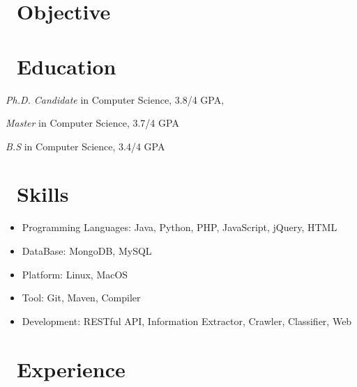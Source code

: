 \documentclass{resume}
\begin{document}





\section{\faSearch\ Objective}



\section{\faGraduationCap\ Education}

\textit{Ph.D. Candidate} in Computer Science, 3.8/4 GPA,

\textit{Master} in Computer Science, 3.7/4 GPA

\textit{B.S} in Computer Science, 3.4/4 GPA


\section{\faCogs\ Skills}
\begin{itemize}[parsep=0.5ex]
  \item Programming Languages: Java, Python, PHP, JavaScript, jQuery, HTML
  \item DataBase: MongoDB, MySQL
  \item Platform: Linux, MacOS
  \item Tool: Git, Maven, Compiler
  \item Development: RESTful API, Information Extractor, Crawler, Classifier, Web
\end{itemize}


\section{\faUsers\ Experience}
\end{document}
